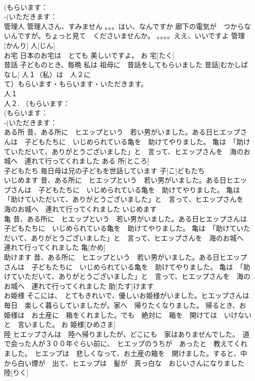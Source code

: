 \documentclass[8pt]{extreport}
\begin{document}
\begin{CJK}{UTF8}{min}
\\	(もらいます：
\\	-(いただきます：
\\	管理人	管理人さん、すみません 。。。はい、なんですか 廊下の電気が　つからないんですが。ちょっと見て　くださいませんか。 。。。。ええ、いいですよ	管理[かんり] 人[じん]			
\\	お宅	日本のお宅は　とても 美しいですよ。	お 宅[たく]					
\\	昔話	子どものとき、毎晩 私は 祖母に　昔話をしてもらいました	昔話[むかしばなし]				人１（私）は　人２に　
\\	て）もらいます・もらいます・いただきます。
\\	人１
\\	人２. （もらいます：
\\	(もらいます：
\\	-(いただきます：
\\	ある所	昔、ある所に　ヒエップという　若い男がいました。ある日ヒエップさんは　子どもたちに　いじめられている亀を　助けてやりました。 亀は　「助けていただいて、ありがとうございました」と　言って、ヒエップさんを　海のお城へ　連れて行ってくれました	ある 所[ところ]			
\\	子どもたち	毎日母は兄の子どもを世話しています	子[こ]どもたち					
\\	いじめます	昔、ある所に　ヒエップという　若い男がいました。ある日ヒエップさんは　子どもたちに　いじめられている亀を　助けてやりました。 亀は　「助けていただいて、ありがとうございました」と　言って、ヒエップさんを　海のお城へ　連れて行ってくれました	いじめます			
\\	亀	昔、ある所に　ヒエップという　若い男がいました。ある日ヒエップさんは　子どもたちに　いじめられている亀を　助けてやりました。 亀は　「助けていただいて、ありがとうございました」と　言って、ヒエップさんを　海のお城へ　連れて行ってくれました	亀[かめ]			
\\	助けます	昔、ある所に　ヒエップという　若い男がいました。ある日ヒエップさんは　子どもたちに　いじめられている亀を　助けてやりました。 亀は　「助けていただいて、ありがとうございました」と　言って、ヒエップさんを　海のお城へ　連れて行ってくれました	助[たす]けます					
\\	お姫様	そこには、　とてもきれいで、優しいお姫様がいました。ヒエップさんは　毎日　楽しく暮らしていましたが。家へ　帰りたくなりました。 帰るとき、お姫様は　お土産に　箱をくれました。でも　絶対に　箱を　開けては　いけないと　言いました。	お 姫様[ひめさま]			
\\	陸	ヒエップさんは　陸へ帰りましたが、どこにも　家はありませんでした。　道で会った人が３００年ぐらい前に、　ヒエップのうちが　あったと　教えてくれました。　ヒエップは　悲しくなって、お土産の箱を　開けました。すると、中から白い煙が　出て、ヒエップは　髪が　真っ白な　おじいさんになりました	陸[りく]					

\end{CJK}
\end{document}
